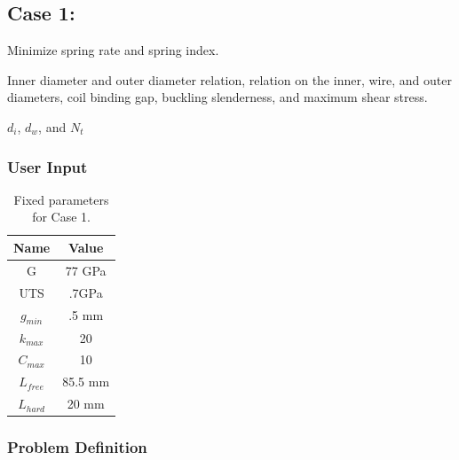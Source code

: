 \documentclass[10pt]{article}
\begin{document}
\subsection{Case 1:}
\label{subsec:Case1}

\begin{description}[leftmargin=!,labelwidth=\widthof{\bfseries Design Variables:}, labelindent = 1cm]
 	\item [Objectives:] Minimize spring rate and spring index.\\

	\item[Constraints:] Inner diameter and outer diameter relation, relation on the inner, wire, and outer diameters, coil binding gap, buckling slenderness, and maximum shear stress. \\
	\item[Design Variables:] $d_{i}$, $d_{w}$, and $N_{t}$ \\
\end{description}

	\subsubsection{User Input}
	

	 \begin{table}[H]
	 \centering
	 	\caption{Fixed parameters for Case 1.}
	 	\begin{tabular}{c c}
		        \hline \hline 
		 	Name & Value\\
			 \hline
		 	 G & 77 GPa \\
			 UTS & .7GPa \\
			 $g_{min}$ & .5 mm\\ 
		 	 $k_{max}$ & 20\\
			 $C_{max}$ & 10\\
			 $L_{free}$ & 85.5 mm\\
			 $L_{hard}$ & 20 mm\\
			\hline \hline
		\end{tabular}
	 \end{table}


	

	\subsubsection{Problem Definition}
	
\end{document}
